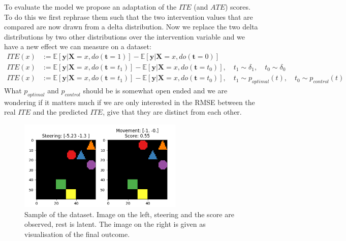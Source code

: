 \documentclass{article}
\newcommand{\E}{\mathbb{E}}
\newcommand{\bt}{\mathbf{t}}
\newcommand{\bX}{\mathbf{X}}
\newcommand{\by}{\mathbf{y}}
\begin{document}
To evaluate the model we propose an adaptation of the $ITE$ (and $ATE$) scores. To do this we first rephrase them such that the two intervention values that are compared are now drawn from a delta distribution. Now we replace the two delta distributions by two other distributions over the intervention variable and we have a new effect we can measure on a dataset:
\begin{align}
    ITE(x) &:= \E[\by | \bX=x, do(\bt=1)] - \E[\by | \bX=x, do(\bt=0)]\\
    ITE(x) &:= \E[\by | \bX=x, do(\bt=t_1)] - \E[\by | \bX=x, do(\bt=t_0)], \quad t_1 \sim \delta_1, \quad t_0 \sim \delta_0\\
    ITE(x) &:= \E[\by | \bX=x, do(\bt=t_1)] - \E[\by | \bX=x, do(\bt=t_0)], \quad t_1 \sim p_{optimal}(t), \quad t_0 \sim p_{control}(t)
\end{align}
What $p_{optimal}$ and $p_{control}$ should be is somewhat open ended and we are wondering if it matters much if we are only interested in the RMSE between the real $ITE$ and the predicted $ITE$, give that they are distinct from each other.

\begin{figure}[h]
    \centering
    \includegraphics[width=0.7\textwidth]{latex/Figures/sample_space_shapes_with_score.png}
    \caption{Sample of the dataset. Image on the left, steering and the score are observed, rest is latent. The image on the right is given as visualisation of the final outcome.}
    \label{fig:my_label}
\end{figure}
\end{document}
